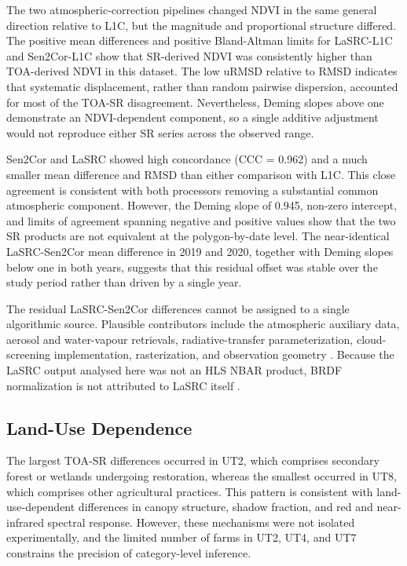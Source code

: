 \documentclass[remotesensing,article,submit,pdftex,oneauthor]{Definitions/mdpi}
\begin{document}
The two atmospheric-correction pipelines changed NDVI in the same
general direction relative to L1C, but the magnitude and proportional
structure differed. The positive mean differences and positive
Bland-Altman limits for LaSRC-L1C and Sen2Cor-L1C show that SR-derived
NDVI was consistently higher than TOA-derived NDVI in this dataset. The
low uRMSD relative to RMSD indicates that systematic displacement,
rather than random pairwise dispersion, accounted for most of the TOA-SR
disagreement. Nevertheless, Deming slopes above one demonstrate an
NDVI-dependent component, so a single additive adjustment would not
reproduce either SR series across the observed range.

Sen2Cor and LaSRC showed high concordance (CCC = 0.962) and a much
smaller mean difference and RMSD than either comparison with L1C. This
close agreement is consistent with both processors removing a
substantial common atmospheric component. However, the Deming slope of
0.945, non-zero intercept, and limits of agreement spanning negative and
positive values show that the two SR products are not equivalent at the
polygon-by-date level. The near-identical LaSRC-Sen2Cor mean difference
in 2019 and 2020, together with Deming slopes below one in both years,
suggests that this residual offset was stable over the study period
rather than driven by a single year.

The residual LaSRC-Sen2Cor differences cannot be assigned to a single
algorithmic source. Plausible contributors include the atmospheric
auxiliary data, aerosol and water-vapour retrievals, radiative-transfer
parameterization, cloud-screening implementation, rasterization, and
observation geometry \citep{MainKnorn2017, Vermote2016, Vermote2018}.
Because the LaSRC output analysed here was not an HLS NBAR product, BRDF
normalization is not attributed to LaSRC itself
\citep{Franch2019, USGSHLS2024}.

\subsection{Land-Use Dependence}\label{sec-disc-gradiente}

The largest TOA-SR differences occurred in UT2, which comprises
secondary forest or wetlands undergoing restoration, whereas the
smallest occurred in UT8, which comprises other agricultural practices.
This pattern is consistent with land-use-dependent differences in canopy
structure, shadow fraction, and red and near-infrared spectral response.
However, these mechanisms were not isolated experimentally, and the
limited number of farms in UT2, UT4, and UT7 constrains the precision of
category-level inference.
\end{document}
